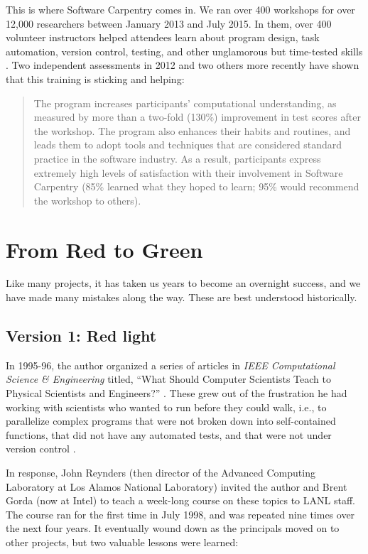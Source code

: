 \documentclass[10pt,a4paper,twocolumn]{article}
\begin{document}
This is where Software Carpentry comes in. We ran over 400 workshops
for over 12,000 researchers between January 2013 and July 2015. In
them, over 400 volunteer instructors helped attendees learn about
program design, task automation, version control, testing, and other
unglamorous but time-tested skills \cite{wilson2013}. Two independent
assessments in 2012 \cite{aranda2012,libarkin2012} and two others more
recently \cite{schossau2014,simperler2015} have shown that this
training is sticking and helping:

\begin{quote}
The program increases participants' computational understanding, as
measured by more than a two-fold (130\%) improvement in test scores
after the workshop. The program also enhances their habits and routines,
and leads them to adopt tools and techniques that are considered
standard practice in the software industry. As a result, participants
express extremely high levels of satisfaction with their involvement in
Software Carpentry (85\% learned what they hoped to learn; 95\% would
recommend the workshop to others).
\end{quote}

\section*{From Red to Green}

Like many projects, it has taken us years to become an overnight
success, and we have made many mistakes along the way.  These are best
understood historically.

\subsection*{Version 1: Red light}

In 1995-96, the author organized a series of articles in \emph{IEEE
Computational Science \& Engineering} titled, ``What Should Computer
Scientists Teach to Physical Scientists and Engineers?'' \cite{wilson1996}.
These grew out of the frustration he had working with scientists
who wanted to run before they could walk, i.e., to parallelize complex
programs that were not broken down into self-contained functions, that
did not have any automated tests, and that were not under version control
\cite{wilson2006a}.

In response, John Reynders (then director of the Advanced Computing
Laboratory at Los Alamos National Laboratory) invited the author and
Brent Gorda (now at Intel) to teach a week-long course on these topics
to LANL staff. The course ran for the first time in July 1998, and was
repeated nine times over the next four years. It eventually wound down
as the principals moved on to other projects, but two valuable lessons
were learned:
\end{document}
